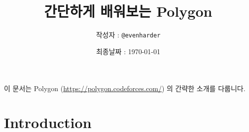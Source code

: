 \documentclass{article}
\title{간단하게 배워보는 Polygon}
\author{작성자 : \texttt{@evenharder}}
\date{최종날짜 : \today}
\begin{document}
    \maketitle
    이 문서는 Polygon (\url{https://polygon.codeforces.com/}) 의 간략한 소개를 다룹니다.
    \tableofcontents
    \newpage
    \section{Introduction}
    
\end{document}
